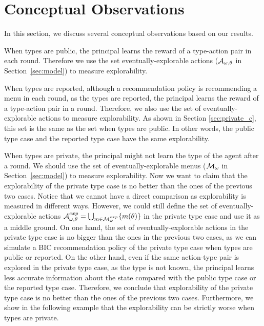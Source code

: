 
\section{Conceptual Observations}
In this section, we discuss several conceptual observations based on our results.

When types are public, the principal learns the reward of a type-action pair in each round. Therefore we use the set eventually-explorable actions ($\mathcal{A}_{\omega,\theta}$ in Section~\ref{sec:model}) to measure explorability.

When types are reported, although a recommendation policy is recommending a menu in each round, as the types are reported, the principal learns the reward of a type-action pair in a round. Therefore, we also use the set of eventually-explorable actions to measure explorability. As shown in Section \ref{sec:private_c}, this set is the same as the set when types are public. In other words, the public type case and the reported type case have the same explorability.

When types are private, the principal might not learn the type of the agent after a round. We should use the set of eventually-explorable menus ($\mathcal{M}_{\omega}$ in Section~\ref{sec:model}) to measure explorability. Now we want to claim that the explorability of the private type case is no better than the ones of the previous two cases. Notice that we cannot have a direct comparison as explorability is measured in different ways. However, we could still define the set of eventually-explorable actions $\mathcal{A}^{exp}_{\omega,\theta} = \bigcup_{m\in \mathcal{M}^{exp}_{\omega}} \{ m(\theta)\}$ in the private type case and use it as a middle ground. On one hand, the set of eventually-explorable actions in the private type case is no bigger than the ones in the previous two cases, as we can simulate a BIC recommendation policy of the private type case when types are public or reported. On the other hand, even if the same action-type pair is explored in the private type case, as the type is not known, the principal learns less accurate information about the state compared with the public type case or the reported type case. Therefore, we conclude that explorability of the private type case is no better than the ones of the previous two cases.  Furthermore, we show in the following example that the explorability can be strictly worse when types are private.

